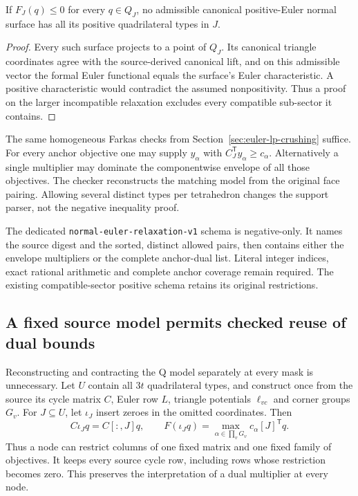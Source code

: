 \begin{proposition}
If $F_J(q)\le0$ for every $q\in Q_J$, no admissible canonical positive-Euler
normal surface has all its positive quadrilateral types in $J$.
\end{proposition}
\begin{proof}
Every such surface projects to a point of $Q_J$.  Its canonical triangle
coordinates agree with the source-derived canonical lift, and on this
admissible vector the formal Euler functional equals the surface's Euler
characteristic.  A positive characteristic would contradict the assumed
nonpositivity.  Thus a proof on the larger incompatible relaxation excludes
every compatible sub-sector it contains.
\end{proof}

The same homogeneous Farkas checks from
Section~\ref{sec:euler-lp-crushing} suffice.  For every anchor objective one
may supply $y_\alpha$ with
$C_J^{\mathsf T}y_\alpha\ge c_\alpha$.  Alternatively a single multiplier
may dominate the componentwise envelope of all those objectives.  The
checker reconstructs the matching model from the original face pairing.
Allowing several distinct types per tetrahedron changes the support parser,
not the negative inequality proof.

The dedicated \texttt{normal-euler-relaxation-v1} schema is negative-only.
It names the source digest and the sorted, distinct allowed pairs, then
contains either the envelope multipliers or the complete anchor-dual list.
Literal integer indices, exact rational arithmetic and complete anchor
coverage remain required.  The existing compatible-sector positive schema
retains its original restrictions.

\subsection{A fixed source model permits checked reuse of dual bounds}

Reconstructing and contracting the Q model separately at every mask is
unnecessary.  Let $U$ contain all $3t$ quadrilateral types, and construct once
from the source its cycle matrix $C$, Euler row $L$, triangle potentials
$\ell_{vc}$ and corner groups $G_v$.  For $J\subseteq U$, let $\iota_J$ insert
zeroes in the omitted coordinates.  Then
\[
 C\iota_Jq=C[:,J]q,\qquad
 F(\iota_Jq)=\max_{\alpha\in\prod_vG_v}c_\alpha[J]^{\mathsf T}q.
\]
Thus a node can restrict columns of one fixed matrix and one fixed family
of objectives.  It keeps every source cycle row, including rows whose
restriction becomes zero.  This preserves the interpretation of a dual
multiplier at every node.

